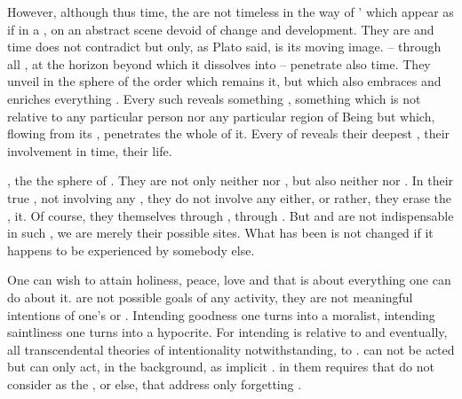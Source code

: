 However, although  thus time, the  are not
timeless in the way of ' which appear as if in a ,
on an abstract scene devoid of change and development.  They are 
and time does not contradict  but only, as Plato said, is its
moving image.
 --  through all , at the horizon
beyond which it dissolves into  -- penetrate also time. They
unveil in the sphere of  the order which remains  it, but
which also embraces and enriches everything . Every such
 reveals something , something which is not
relative to any particular person nor any particular region of Being but which,
flowing from its , penetrates the whole of it. Every
 of  reveals their deepest ,
their involvement in time, their life.


\pa 
{}, the   the sphere of
. They are not only neither  nor , but
also neither  nor .  In their true ,
not involving any , they do not involve any  either, or
rather, they erase the ,  it.
Of course, they  themselves through , through . But
 and  are not indispensable in such , we 
are merely their possible sites. What has been  is not
changed if it happens to be  experienced by somebody
else.

One can wish to attain holiness, peace, love and that is about everything one
can do about it.   are not possible goals of any activity, they
are not meaningful intentions of one's  or . Intending
goodness one turns into a moralist, intending saintliness one turns into a
hypocrite. For intending is relative to  and eventually, all
transcendental theories of intentionality notwithstanding, to .
 can not be acted but can only act, in the background, as
implicit .   in them requires that  do
not consider  as the , or else, that  address
 only forgetting .

